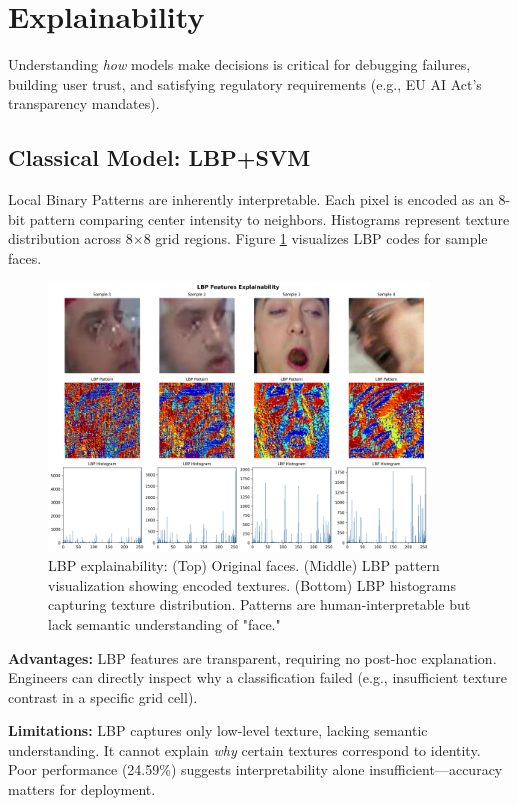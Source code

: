 \documentclass[11pt,a4paper]{article}
\begin{document}
\section{Explainability}

Understanding \textit{how} models make decisions is critical for debugging failures, building user trust, and satisfying regulatory requirements (e.g., EU AI Act's transparency mandates).

\subsection{Classical Model: LBP+SVM}

Local Binary Patterns are inherently interpretable. Each pixel is encoded as an 8-bit pattern comparing center intensity to neighbors. Histograms represent texture distribution across 8×8 grid regions. Figure \ref{fig:lbp} visualizes LBP codes for sample faces.

\begin{figure}[H]
    \centering
    \includegraphics[width=0.9\textwidth]{runs/explainability/lbp_explainability.png}
    \caption{LBP explainability: (Top) Original faces. (Middle) LBP pattern visualization showing encoded textures. (Bottom) LBP histograms capturing texture distribution. Patterns are human-interpretable but lack semantic understanding of "face."}
    \label{fig:lbp}
\end{figure}

\textbf{Advantages:} LBP features are transparent, requiring no post-hoc explanation. Engineers can directly inspect why a classification failed (e.g., insufficient texture contrast in a specific grid cell).

\textbf{Limitations:} LBP captures only low-level texture, lacking semantic understanding. It cannot explain \textit{why} certain textures correspond to identity. Poor performance (24.59\%) suggests interpretability alone insufficient—accuracy matters for deployment.
\end{document}
